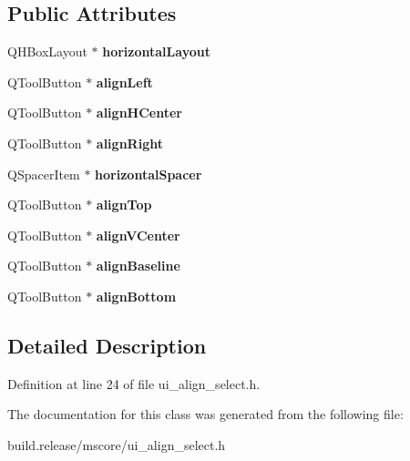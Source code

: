 \subsection*{Public Attributes}
\begin{DoxyCompactItemize}
\item 
\mbox{\label{class_ui___align_select_a59265f2c22572144e07282ed8b3601ec}} 
Q\+H\+Box\+Layout $\ast$ {\bfseries horizontal\+Layout}
\item 
\mbox{\label{class_ui___align_select_a33f5274de7a399fdc05de866c8e88339}} 
Q\+Tool\+Button $\ast$ {\bfseries align\+Left}
\item 
\mbox{\label{class_ui___align_select_afcb1bce79d42fed2fe0cf6b79b9b0227}} 
Q\+Tool\+Button $\ast$ {\bfseries align\+H\+Center}
\item 
\mbox{\label{class_ui___align_select_a9fcc55d3368eb9ad8e917b90b70075d6}} 
Q\+Tool\+Button $\ast$ {\bfseries align\+Right}
\item 
\mbox{\label{class_ui___align_select_a51f25885ca97c2ba2d6cbeae33da815c}} 
Q\+Spacer\+Item $\ast$ {\bfseries horizontal\+Spacer}
\item 
\mbox{\label{class_ui___align_select_a00e480530739f84a15a3c6766c1f6f2b}} 
Q\+Tool\+Button $\ast$ {\bfseries align\+Top}
\item 
\mbox{\label{class_ui___align_select_a7cfac7f01e7e880db91e851cfb2ed866}} 
Q\+Tool\+Button $\ast$ {\bfseries align\+V\+Center}
\item 
\mbox{\label{class_ui___align_select_a0b9c8741af4978247b676c7afead045b}} 
Q\+Tool\+Button $\ast$ {\bfseries align\+Baseline}
\item 
\mbox{\label{class_ui___align_select_a7ab4ebea39b5a388be9e4de4fc6e054d}} 
Q\+Tool\+Button $\ast$ {\bfseries align\+Bottom}
\end{DoxyCompactItemize}


\subsection{Detailed Description}


Definition at line 24 of file ui\+\_\+align\+\_\+select.\+h.



The documentation for this class was generated from the following file\+:\begin{DoxyCompactItemize}
\item 
build.\+release/mscore/ui\+\_\+align\+\_\+select.\+h\end{DoxyCompactItemize}
